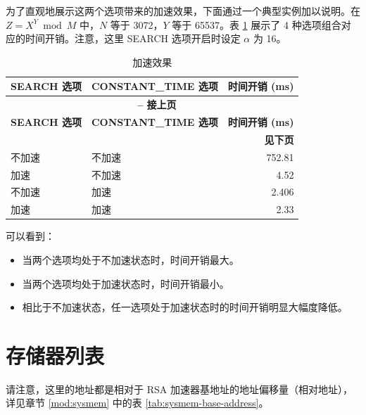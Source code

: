 \documentclass[main\_\_CN.tex]{subfiles}
\begin{document}
为了直观地展示这两个选项带来的加速效果，下面通过一个典型实例加以说明。在 \begin{math}Z = X^{Y} \bmod M\end{math} 中，\begin{math}N\end{math} 等于 3072，\begin{math}Y\end{math} 等于 65537。表 \ref{tab:accelerationeffect} 展示了 4 种选项组合对应的时间开销。注意，这里 SEARCH 选项开启时设定 \begin{math} \alpha \end{math} 为 16。

\begin{longtable}{ | l | l | r | }
    \caption{加速效果}\label{tab:accelerationeffect}
    \\\hline\rowcolor{lightgray}
    \textbf{SEARCH 选项} & \textbf{CONSTANT\_TIME 选项} & \textbf{时间开销 (ms)}  \\ \hline
    \endfirsthead

    \multicolumn{3}{c}{\bfseries \tablename\ \thetable{} -- 接上页}\\\hline

    \rowcolor{lightgray}
    \textbf{SEARCH 选项} & \textbf{CONSTANT\_TIME 选项} & \textbf{时间开销 (ms)}  \\ \hline
    \endhead

    \multicolumn{3}{r}{\textbf{见下页}} \\
    \endfoot
    \endlastfoot
    \hline

    不加速 & 不加速 & 752.81   \\ \hline
    加速 & 不加速 & 4.52     \\ \hline
    不加速 & 加速 & 2.406     \\ \hline
    加速 & 加速 & 2.33     \\ \hline
\end{longtable}

可以看到：
\begin{itemize}
    \item 当两个选项均处于不加速状态时，时间开销最大。
    \item 当两个选项均处于加速状态时，时间开销最小。
    \item 相比于不加速状态，任一选项处于加速状态时的时间开销明显大幅度降低。
\end{itemize}

\section{ 存储器列表 }\label{sec:mem-sum}
请注意，这里的地址都是相对于 RSA 加速器基地址的地址偏移量（相对地址），详见章节 \ref{mod:sysmem} \textit{} 中的表 \ref{tab:sysmem-base-address}。

\end{document}
